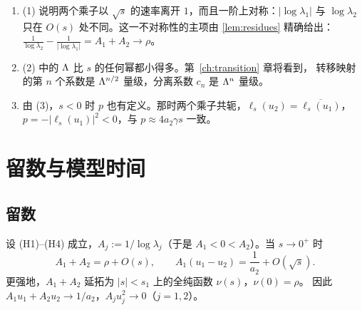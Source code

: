 \begin{remark}\label{ch4:rem:scales}
\begin{enumerate}
\item (1) 说明两个乘子以 $\sqrt s$ 的速率离开 $1$，而且一阶上对称：$|\log\lambda_1|$ 与 $\log\lambda_2$
  只在 $O(s)$ 处不同。这一不对称性的主项由 \cref{lem:residues} 精确给出：
  $\frac1{\log\lambda_2}-\frac1{|\log\lambda_1|}=A_1+A_2\to\rho$。
\item (2) 中的 $\Lambda$ 比 $s$ 的任何幂都小得多。第~\ref{ch:transition} 章将看到，
  转移映射的第 $n$ 个系数是 $\Lambda^{n/2}$ 量级，分离系数 $c_n$ 是 $\Lambda^n$ 量级。
\item 由 (3)，$s<0$ 时 $p$ 也有定义。那时两个乘子共轭，$\ell_s(u_2)=\overline{\ell_s(u_1)}$，
  $p=-|\ell_s(u_1)|^2<0$，与 $p\approx4a_2\gamma s$ 一致。
\end{enumerate}
\end{remark}

\section{留数与模型时间}\label{ch4:sec:residues}

\subsection{留数}

\begin{lemma}[留数]\label{lem:residues}
设 (H1)--(H4) 成立，$A_j:=1/\log\lambda_j$（于是 $A_1<0<A_2$）。当 $s\to0^+$ 时
\[
 A_1+A_2=\rho+O(s),\qquad A_1(u_1-u_2)=\frac1{a_2}+O(\sqrt s).
\]
更强地，$A_1+A_2$ 延拓为 $|s|<s_1$ 上的全纯函数 $\nu(s)$，$\nu(0)=\rho$。
因此 $A_1u_1+A_2u_2\to1/a_2$，$A_ju_j^2\to0$（$j=1,2$）。
\end{lemma}

